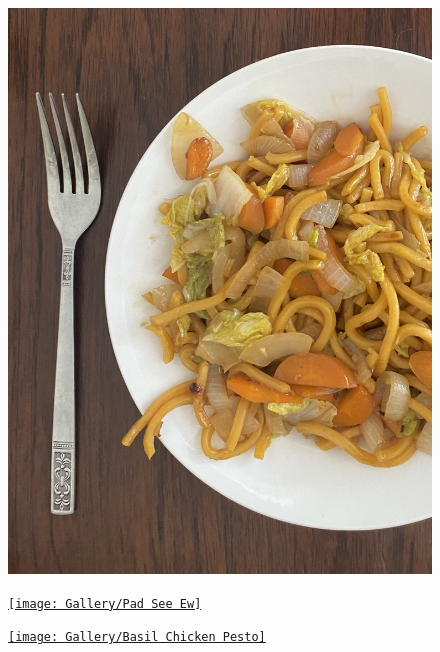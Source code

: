 \documentclass[]{article}
\begin{document}
\newpage\begin{figure}[H]
\begin{center}\hyperref[rec:Hokkien Mee]{\includegraphics[keepaspectratio,width=\textwidth,height=\textheight]{Gallery/Hokkien Mee}}\caption*{}\label{fig:Hokkien Mee}\end{center}
\end{figure}
\newpage\begin{figure}[H]
\begin{center}\hyperref[rec:Pad See Ew]{\texttt{[image: Gallery/Pad See Ew]}}\caption*{}\label{fig:Pad See Ew}\end{center}
\end{figure}
\newpage\begin{figure}[H]
\begin{center}\hyperref[rec:Basil Chicken Pesto]{\texttt{[image: Gallery/Basil Chicken Pesto]}}\caption*{}\label{fig:Basil Chicken Pesto}\end{center}
\end{figure}
\end{document}
